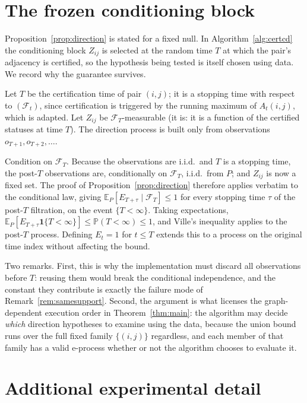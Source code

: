 \documentclass[pdflatex,sn-apa]{sn-jnl}
\theoremstyle{thmstyleone}%
\theoremstyle{thmstyletwo}%
\theoremstyle{thmstylethree}%
\newcommand{\Fcal}{\mathcal{F}}
\newcommand{\Prob}{\mathbb{P}}
\newcommand{\Exp}{\mathbb{E}}
\begin{document}
\begin{appendices}
\section{The frozen conditioning block}\label{app:conditioning}

Proposition~\ref{prop:direction} is stated for a fixed null. In
Algorithm~\ref{alg:certcd} the conditioning block $Z_{ij}$ is selected at the
random time $T$ at which the pair's adjacency is certified, so the hypothesis
being tested is itself chosen using data. We record why the guarantee survives.

Let $T$ be the certification time of pair $(i,j)$; it is a stopping time with
respect to $(\Fcal_t)$, since certification is triggered by the running
maximum of $A_t(i,j)$, which is adapted. Let $Z_{ij}$ be $\Fcal_T$-measurable
(it is: it is a function of the certified statuses at time $T$). The direction
process is built only from observations $o_{T+1}, o_{T+2}, \dots$.

Condition on $\Fcal_T$. Because the observations are i.i.d.\ and $T$ is a
stopping time, the post-$T$ observations are, conditionally on $\Fcal_T$,
i.i.d.\ from $P$; and $Z_{ij}$ is now a fixed set. The proof of
Proposition~\ref{prop:direction} therefore applies verbatim to the
conditional law, giving
$\Exp_P[E_{T+\tau} \mid \Fcal_T] \le 1$ for every stopping time $\tau$ of the
post-$T$ filtration, on the event $\{T < \infty\}$. Taking expectations,
$\Exp_P[E_{T+\tau} \mathbf{1}\{T<\infty\}] \le \Prob(T<\infty) \le 1$, and
Ville's inequality applies to the post-$T$ process. Defining $E_t = 1$ for
$t \le T$ extends this to a process on the original time index without
affecting the bound.

Two remarks. First, this is why the implementation must discard all
observations before $T$: reusing them would break the conditional
independence, and the constant they contribute is exactly the failure mode of
Remark~\ref{rem:samesupport}. Second, the argument is what licenses the
graph-dependent execution order in Theorem~\ref{thm:main}: the algorithm may
decide \emph{which} direction hypotheses to examine using the data, because
the union bound runs over the full fixed family $\{(i,j)\}$ regardless, and
each member of that family has a valid e-process whether or not the algorithm
chooses to evaluate it.

\section{Additional experimental detail}\label{app:extra}


\end{appendices}
\end{document}
